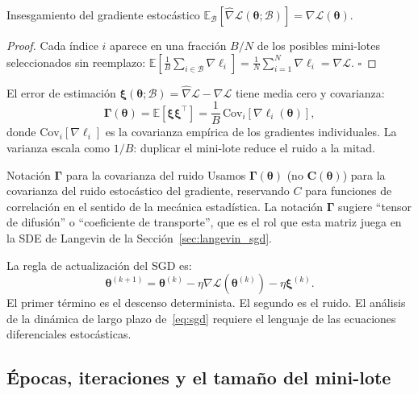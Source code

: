 \begin{proposicion}{Insesgamiento del gradiente estocástico}
\label{prop:insesgado}
$\mathbb{E}_{\mathcal{B}}[\hat{\nabla}\mathcal{L}(\bm{\theta};\mathcal{B})]
= \nabla\mathcal{L}(\bm{\theta})$.
\end{proposicion}

\begin{proof}
Cada índice $i$ aparece en una fracción $B/N$ de los posibles mini-lotes
seleccionados sin reemplazo:
$\mathbb{E}[\frac{1}{B}\sum_{i\in\mathcal{B}}\nabla\ell_i] =
\frac{1}{N}\sum_{i=1}^N\nabla\ell_i = \nabla\mathcal{L}$. $\square$
\end{proof}

El error de estimación $\bm{\xi}(\bm{\theta};\mathcal{B}) =
\hat{\nabla}\mathcal{L} - \nabla\mathcal{L}$ tiene media cero y
covarianza:
\begin{equation}
  \bm{\Gamma}(\bm{\theta})
  = \mathbb{E}[\bm{\xi}\bm{\xi}^\top]
  = \frac{1}{B}\,\mathrm{Cov}_i[\nabla\ell_i(\bm{\theta})],
  \label{eq:cov_ruido}
\end{equation}
donde $\mathrm{Cov}_i[\nabla\ell_i]$ es la covarianza empírica de los
gradientes individuales. La varianza escala como $1/B$: duplicar el
mini-lote reduce el ruido a la mitad.

\begin{observacion}{Notación $\bm{\Gamma}$ para la covarianza del ruido}
Usamos $\bm{\Gamma}(\bm{\theta})$ (no $\bm{C}(\bm{\theta})$) para la
covarianza del ruido estocástico del gradiente, reservando $C$ para
funciones de correlación en el sentido de la mecánica estadística. La
notación $\bm{\Gamma}$ sugiere ``tensor de difusión'' o ``coeficiente de
transporte'', que es el rol que esta matriz juega en la SDE de Langevin
de la Sección~\ref{sec:langevin_sgd}.
\end{observacion}

La regla de actualización del SGD es:
\begin{equation}
  \bm{\theta}^{(k+1)} = \bm{\theta}^{(k)}
  - \eta\nabla\mathcal{L}(\bm{\theta}^{(k)})
  - \eta\bm{\xi}^{(k)}.
  \label{eq:sgd}
\end{equation}
El primer término es el descenso determinista. El segundo es el ruido. El
análisis de la dinámica de largo plazo de~\eqref{eq:sgd} requiere el
lenguaje de las ecuaciones diferenciales estocásticas.

\subsection{Épocas, iteraciones y el tamaño del mini-lote}
\label{subsec:epocas}

